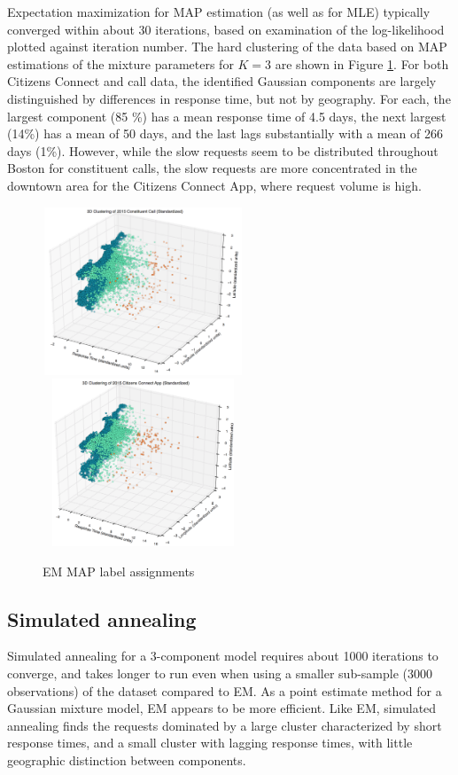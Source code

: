 \documentclass[twoside]{article}
\theoremstyle{theorem}
\theoremstyle{theorem}
\theoremstyle{theorem}
\theoremstyle{lemma}
\theoremstyle{definition}
\theoremstyle{example}
\begin{document}
Expectation maximization for MAP estimation (as well as for MLE) typically converged within about 30 iterations, based on examination of the log-likelihood plotted against iteration number. The hard clustering of the data based on MAP estimations of the mixture parameters for $K=3$ are shown in Figure \ref{EMlabels}. For both Citizens Connect and call data, the identified Gaussian components are largely distinguished by differences in response time, but not by geography. For each, the largest component (85 \%) has a mean response time of 4.5 days, the next largest (14\%) has a mean of 50 days, and the last lags substantially with a mean of 266 days (1\%). However, while the slow requests seem to be distributed throughout Boston for constituent calls, the slow requests are more concentrated in the downtown area for the Citizens Connect App, where request volume is high.
\begin{figure}[h!]
\begin{center}
\includegraphics[width=60mm, height=50mm]{3D_call}
\includegraphics[width=60mm, height=50mm]{3D_app}
\caption{EM MAP label assignments}
\label{EMlabels}
\end{center}
\end{figure}

\subsection{Simulated annealing}
Simulated annealing for a 3-component model requires about 1000 iterations to converge, and takes longer to run even when using a smaller sub-sample (3000 observations) of the dataset compared to EM. As a point estimate method for a Gaussian mixture model, EM appears to be more efficient. Like EM, simulated annealing finds the requests dominated by a large cluster characterized by short response times, and a small cluster with lagging response times, with little geographic distinction between components. 
\end{document}
